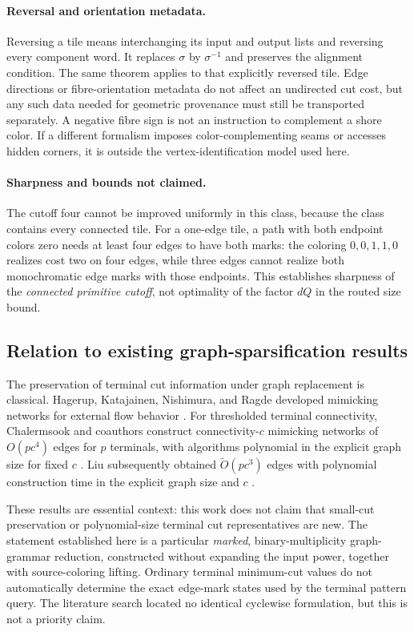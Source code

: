 \paragraph{Reversal and orientation metadata.}
Reversing a tile means interchanging its input and output lists and
reversing every component word.  It replaces $\sigma$ by $\sigma^{-1}$
and preserves the alignment condition.  The same theorem applies to
that explicitly reversed tile.  Edge directions or fibre-orientation
metadata do not affect an undirected cut cost, but any such data needed
for geometric provenance must still be transported separately.  A
negative fibre sign is not an instruction to complement a shore color.
If a different formalism imposes color-complementing seams or accesses
hidden corners, it is outside the vertex-identification model used here.

\paragraph{Sharpness and bounds not claimed.}
The cutoff four cannot be improved uniformly in this class, because the
class contains every connected tile.  For a one-edge tile, a path with
both endpoint colors zero needs at least four edges to have both marks:
the coloring $0,0,1,1,0$ realizes cost two on four edges, while three
edges cannot realize both monochromatic edge marks with those endpoints.
This establishes sharpness of the \emph{connected primitive cutoff},
not optimality of the factor $dQ$ in the routed size bound.

\subsection{Relation to existing graph-sparsification results}

The preservation of terminal cut information under graph replacement is
classical.  Hagerup, Katajainen, Nishimura, and Ragde developed mimicking
networks for external flow behavior \cite{hagerup1998}.  For thresholded
terminal connectivity, Chalermsook and coauthors construct
connectivity-$c$ mimicking networks of $O(pc^4)$ edges for $p$ terminals,
with algorithms polynomial in the explicit graph size for fixed $c$
\cite{chalermsook2021}.  Liu subsequently obtained
$\widetilde O(pc^3)$ edges with polynomial construction time in the
explicit graph size and $c$ \cite{liu2023}.

These results are essential context: this work does not claim that small-cut
preservation or polynomial-size terminal cut representatives are new.
The statement established here is a particular \emph{marked},
binary-multiplicity graph-grammar reduction, constructed without expanding
the input power, together with source-coloring lifting.  Ordinary terminal
minimum-cut values do not automatically determine the exact edge-mark
states used by the terminal pattern query.  The literature search located
no identical cyclewise formulation, but this is not a priority claim.

